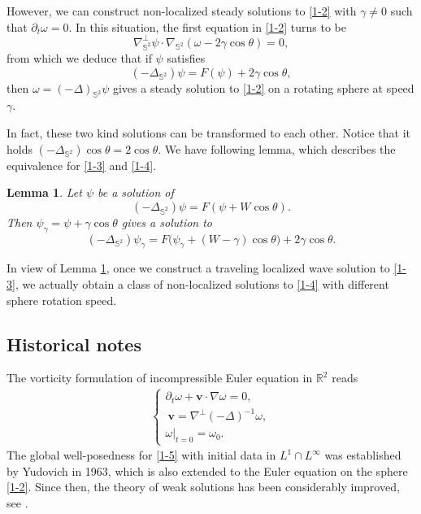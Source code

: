 \documentclass[12pt,reqno]{amsart}
\numberwithin{equation}{section}
\newtheorem{lemma}[theorem]{Lemma}
\theoremstyle{definition}
\theoremstyle{remark}
\begin{document}
    However, we can construct non-localized steady solutions to \eqref{1-2} with $\gamma\neq0$ such that $\partial_t\omega=0$. In this situation, the first equation in \eqref{1-2} turns to be
    \begin{equation*}
    	\nabla_{\mathbb{S}^2}^\perp\psi\cdot \nabla_{\mathbb S^2} (\omega-2\gamma\cos\theta)=0,
    \end{equation*}
    from which we deduce that if $\psi$ satisfies 
    	\begin{equation}\label{1-4}
    	(-\Delta_{\mathbb S^2})\psi=F(\psi)+2\gamma\cos\theta,
    \end{equation}
    then $\omega=(-\Delta)_{\mathbb{S}^2}\psi$ gives a steady solution to \eqref{1-2} on a rotating sphere at speed $\gamma$. 
    
    In fact, these two kind solutions can be transformed to each other. Notice that it holds $(-\Delta_{\mathbb S^2})\cos\theta=2\cos\theta$. We have following lemma, which describes the equivalence for \eqref{1-3} and \eqref{1-4}.
    \begin{lemma}\label{lem1-1}
    	Let $\psi$ be a solution of
    	$$(-\Delta_{\mathbb S^2})\psi=F(\psi+W\cos\theta).$$
    	Then $\psi_\gamma=\psi+\gamma\cos\theta$ gives a solution to
    	$$(-\Delta_{\mathbb S^2})\psi_\gamma=F\big(\psi_\gamma+(W-\gamma)\cos\theta\big)+2\gamma\cos\theta.$$
    \end{lemma} 
    In view of Lemma \ref{lem1-1}, once we construct a traveling localized wave solution to \eqref{1-3}, we actually obtain a class of non-localized solutions to \eqref{1-4} with different sphere rotation speed.
    

    \subsection{Historical notes}
    
    The vorticity formulation of incompressible Euler equation in $\mathbb R^2$ reads
    \begin{align}\label{1-5}
    	\begin{cases}
    		\partial_t\omega+\boldsymbol{v}\cdot \nabla \omega=0,\\
    		\ \boldsymbol{v}=\nabla^\perp(-\Delta)^{-1}\omega,\\
    		\omega\big|_{t=0}=\omega_0.
    	\end{cases}
    \end{align}
    The global well-posedness for \eqref{1-5} with initial data in $L^1\cap L^\infty$ was established by Yudovich \cite{Yud} in 1963, 
    which is also extended to the Euler equation on the sphere \eqref{1-2}. 
    Since then, the theory of weak solutions has been considerably improved, see \cite{Del, Dip, Elg, MB}. 
    
\end{document}

